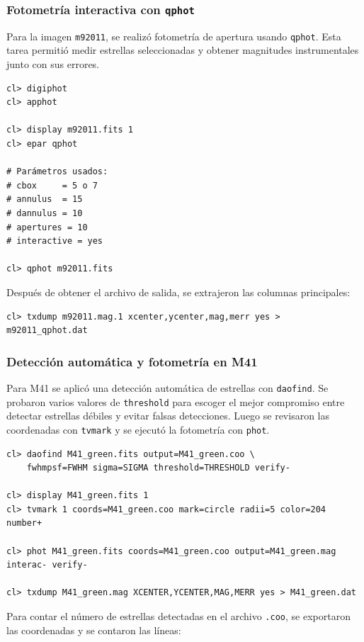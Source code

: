 \documentclass[12pt,letterpaper]{article}
\begin{document}
\subsubsection{Fotometría interactiva con \texttt{qphot}}

Para la imagen \texttt{m92011}, se realizó fotometría de apertura usando \texttt{qphot}. Esta tarea permitió medir estrellas seleccionadas y obtener magnitudes instrumentales junto con sus errores.

\begin{lstlisting}
cl> digiphot
cl> apphot

cl> display m92011.fits 1
cl> epar qphot

# Parámetros usados:
# cbox     = 5 o 7
# annulus  = 15
# dannulus = 10
# apertures = 10
# interactive = yes

cl> qphot m92011.fits
\end{lstlisting}

Después de obtener el archivo de salida, se extrajeron las columnas principales:

\begin{lstlisting}
cl> txdump m92011.mag.1 xcenter,ycenter,mag,merr yes > m92011_qphot.dat
\end{lstlisting}


\subsubsection{Detección automática y fotometría en M41}

Para M41 se aplicó una detección automática de estrellas con \texttt{daofind}. Se probaron varios valores de \texttt{threshold} para escoger el mejor compromiso entre detectar estrellas débiles y evitar falsas detecciones. Luego se revisaron las coordenadas con \texttt{tvmark} y se ejecutó la fotometría con \texttt{phot}.

\begin{lstlisting}
cl> daofind M41_green.fits output=M41_green.coo \
    fwhmpsf=FWHM sigma=SIGMA threshold=THRESHOLD verify-

cl> display M41_green.fits 1
cl> tvmark 1 coords=M41_green.coo mark=circle radii=5 color=204 number+

cl> phot M41_green.fits coords=M41_green.coo output=M41_green.mag interac- verify-

cl> txdump M41_green.mag XCENTER,YCENTER,MAG,MERR yes > M41_green.dat
\end{lstlisting}

Para contar el número de estrellas detectadas en el archivo \texttt{.coo}, se exportaron las coordenadas y se contaron las líneas:
\end{document}
